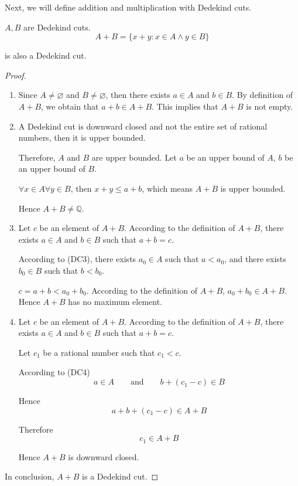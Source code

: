 \par Next, we will define addition and multiplication with Dedekind cuts.

\begin{theorem}[Addition]
    \par $A, B$ are Dedekind cuts.
    \[
        A + B = \{ x + y : x\in A \wedge y\in B \}
    \]
    \par is also a Dedekind cut.
\end{theorem}

\begin{proof}
    \begin{enumerate}[label = (\roman*)]
        \item Since $A\ne\varnothing$ and $B\ne\varnothing$, then there exists $a\in A$ and $b\in B$. By definition of $A + B$, we obtain that $a + b \in A + B$. This implies that $A + B$ is not empty.
        \item A Dedekind cut is downward closed and not the entire set of rational numbers, then it is upper bounded.
              \par Therefore, $A$ and $B$ are upper bounded. Let $a$ be an upper bound of $A$, $b$ be an upper bound of $B$.
              \par $\forall x\in A\forall y\in B$, then $x + y \le a + b$, which means $A + B$ is upper bounded.
              \par Hence $A + B\ne\mathbb{Q}$.
        \item Let $c$ be an element of $A + B$. According to the definition of $A + B$, there exists $a\in A$ and $b\in B$ such that $a + b = c$.
              \par According to (DC3), there exists $a_{0}\in A$ such that $a < a_{0}$, and there exists $b_{0}\in B$ such that $b < b_{0}$.
              \par $c = a + b < a_{0} + b_{0}$. According to the definition of $A + B$, $a_{0} + b_{0} \in A + B$. Hence $A + B$ has no maximum element.
        \item Let $c$ be an element of $A + B$. According to the definition of $A + B$, there exists $a\in A$ and $b\in B$ such that $a + b = c$.
              \par Let $c_{1}$ be a rational number such that $c_{1} < c$.
              \par According to (DC4)
              \[
                  a \in A\qquad\text{and}\qquad b + (c_{1} - c)\in B
              \]
              \par Hence
              \[
                  a + b + (c_{1} - c) \in A + B
              \]
              \par Therefore
              \[
                  c_{1} \in A + B
              \]
              \par Hence $A + B$ is downward closed.
    \end{enumerate}
    \par In conclusion, $A + B$ is a Dedekind cut.
\end{proof}

